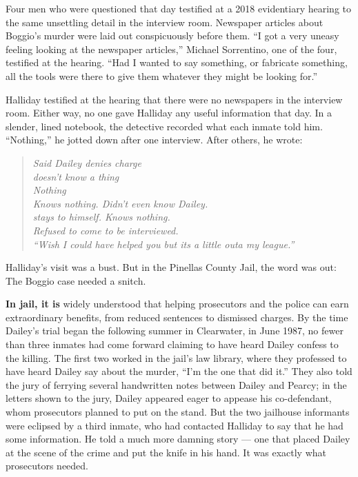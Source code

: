 Four men who were questioned that day testified at a 2018 evidentiary
hearing to the same unsettling detail in the interview room. Newspaper
articles about Boggio's murder were laid out conspicuously before them.
``I got a very uneasy feeling looking at the newspaper articles,''
Michael Sorrentino, one of the four, testified at the hearing. ``Had I
wanted to say something, or fabricate something, all the tools were
there to give them whatever they might be looking for.''

Halliday testified at the hearing that there were no newspapers in the
interview room. Either way, no one gave Halliday any useful information
that day. In a slender, lined notebook, the detective recorded what each
inmate told him. ``Nothing,'' he jotted down after one interview. After
others, he wrote:

\begin{quote}
\emph{Said Dailey denies charge}\\
\emph{doesn't know a thing}\\
\emph{Nothing}\\
\emph{Knows nothing. Didn't even know Dailey.}\\
\emph{stays to himself. Knows nothing.}\\
\emph{Refused to come to be interviewed.}\\
\emph{``Wish I could have helped you but its a little outa my league.''}
\end{quote}

Halliday's visit was a bust. But in the Pinellas County Jail, the word
was out: The Boggio case needed a snitch.

\textbf{In jail, it is} widely understood that helping prosecutors and
the police can earn extraordinary benefits, from reduced sentences to
dismissed charges. By the time Dailey's trial began the following summer
in Clearwater, in June 1987, no fewer than three inmates had come
forward claiming to have heard Dailey confess to the killing. The first
two worked in the jail's law library, where they professed to have heard
Dailey say about the murder, ``I'm the one that did it.'' They also told
the jury of ferrying several handwritten notes between Dailey and
Pearcy; in the letters shown to the jury, Dailey appeared eager to
appease his co-defendant, whom prosecutors planned to put on the stand.
But the two jailhouse informants were eclipsed by a third inmate, who
had contacted Halliday to say that he had some information. He told a
much more damning story --- one that placed Dailey at the scene of the
crime and put the knife in his hand. It was exactly what prosecutors
needed.

